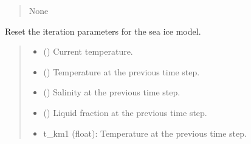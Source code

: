 \documentclass[a4paper,11pt,english,openany]{sphinxmanual}
\begin{document}
\begin{fulllineitems}
\begin{fulllineitems}
\begin{quote}
\begin{description}
\sphinxAtStartPar
None

\end{description}\end{quote}

\end{fulllineitems}


\begin{fulllineitems}
\label{\detokenize{api/spyice.models.sea_ice_model:spyice.models.sea_ice_model.SeaIceModel.reset_iteration_parameters}}
\pysigstartsignatures
{}
\pysigstopsignatures
\sphinxAtStartPar
Reset the iteration parameters for the sea ice model.
\begin{quote}\begin{description}
\begin{itemize}
\item {} 
\sphinxAtStartPar
{} () \textendash{} Current temperature.

\item {} 
\sphinxAtStartPar
{} () \textendash{} Temperature at the previous time step.

\item {} 
\sphinxAtStartPar
{} () \textendash{} Salinity at the previous time step.

\item {} 
\sphinxAtStartPar
{} () \textendash{} Liquid fraction at the previous time step.

\end{itemize}

\sphinxAtStartPar
\begin{description}
\begin{itemize}
\item {} 
\sphinxAtStartPar
t\_km1 (float): Temperature at the previous time step.


\end{itemize}
\end{description}
\end{description}
\end{quote}
\end{fulllineitems}
\end{fulllineitems}
\end{document}
